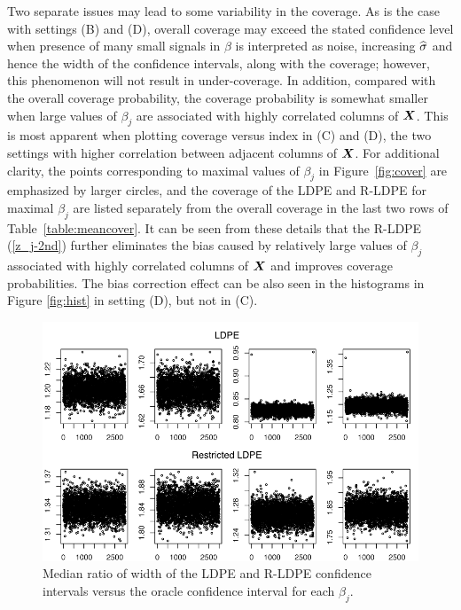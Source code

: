 \documentclass[11pt]{amsart}
\begin{document}
Two separate issues may lead to some variability in the coverage. 
As is the case with settings (B) and (D), overall coverage may exceed the stated confidence level 
when presence of many small signals in $\beta$ is interpreted as noise, increasing $\widehat{\sigma}$ 
and hence the width of the confidence intervals, along with the coverage; 
however, this phenomenon will not result in under-coverage.
In addition, compared with the overall coverage probability, the coverage probability is somewhat smaller 
when large values of $\beta_j$ are associated with highly correlated columns of $\boldsymbol{X}$. 
This is most apparent when plotting coverage versus index in (C) and (D), 
the two settings with higher correlation between adjacent columns of $\boldsymbol{X}$.
For additional clarity, the points corresponding to maximal values of 
$\beta_j$ in Figure~\ref{fig:cover} are emphasized by larger circles, and the coverage of the LDPE and R-LDPE for maximal $\beta_j$ are listed separately from the overall coverage in the last two rows of 
Table~\ref{table:meancover}. 
It can be seen from these details
that the R-LDPE (\ref{z_j-2nd}) further eliminates 
the bias caused by relatively large values of $\beta_j$ associated with highly correlated columns of $\boldsymbol{X}$ 
and improves coverage probabilities. %
The bias correction effect can be also seen in the histograms in Figure \ref{fig:hist} in setting (D), 
but not in (C). 

\begin{figure}%
\includegraphics{widths}
\caption{Median ratio of width of the LDPE and R-LDPE confidence intervals versus the oracle confidence interval for each $\beta_j$.}
\label{fig:width}
\end{figure}
\end{document}
